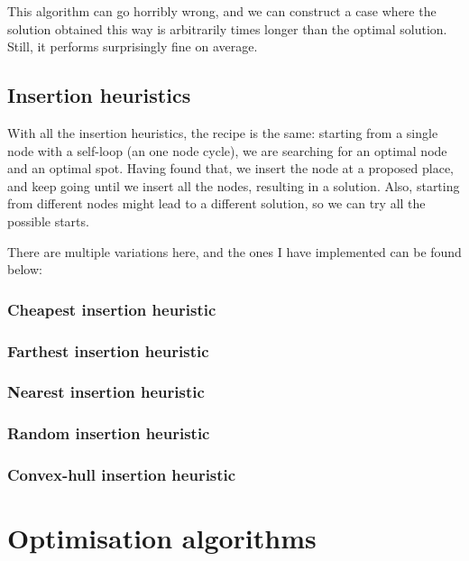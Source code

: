 \documentclass[12pt,twoside,notitlepage]{report}
\begin{document}
\smallskip

This algorithm can go horribly wrong, and we can construct a case where the solution obtained this way is arbitrarily times longer than the optimal solution. Still, it performs surprisingly fine on average.

\subsection{Insertion heuristics}

With all the insertion heuristics, the recipe is the same: starting from a single node with a self-loop (an one node cycle), we are searching for an optimal node and an optimal spot. Having found that, we insert the node at a proposed place, and keep going until we insert all the nodes, resulting in a solution. Also, starting from different nodes might lead to a different solution, so we can try all the possible starts.

\smallskip

There are multiple variations here, and the ones I have implemented can be found below:

\subsubsection{Cheapest insertion heuristic}

\subsubsection{Farthest insertion heuristic}

\subsubsection{Nearest insertion heuristic}

\subsubsection{Random insertion heuristic}

\subsubsection{Convex-hull insertion heuristic}

\section{Optimisation algorithms}
\end{document}
